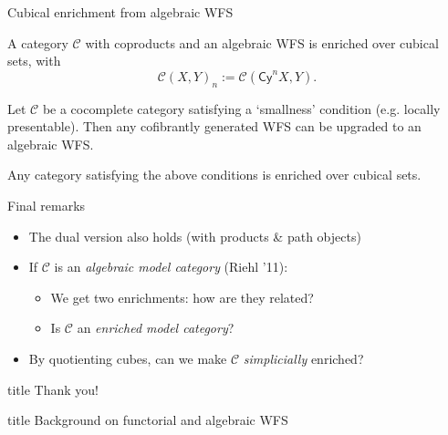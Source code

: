 \documentclass[compress]{beamer}
\newcommand{\varcat}[1]{\mathcal{#1}}
\newcommand{\C}{\varcat{C}}
\newcommand{\1}{\mathbf{1}}
\newcommand{\Cyl}{\mathsf{Cy}}
\begin{document}
\begin{frame}{Cubical enrichment from algebraic WFS}
	\begin{corollary}
		A category $\C$ with coproducts and an algebraic WFS is enriched over cubical sets, with
		\[
			\C(X,Y)_n := \C(\Cyl^n X, Y).	
		\]
	\end{corollary}
	\pause \vfill
	\begin{theorem}[Garner '09]
		Let $\C$ be a cocomplete category satisfying a `smallness' condition (e.g. locally presentable).
		Then any cofibrantly generated WFS can be upgraded to an algebraic WFS.
	\end{theorem}
	\pause \vfill
	\begin{corollary}
		Any category satisfying the above conditions is enriched over cubical sets.
	\end{corollary}
\end{frame}

\begin{frame}{Final remarks}
	\begin{itemize}[<+->]\setlength{\itemsep}{15pt}
		\item The dual version also holds (with products \& path objects)
		\item If $\C$ is an \emph{algebraic model category} (Riehl '11):
			\begin{itemize}[<+->]
		 		\item We get two enrichments: how are they related?
				\item Is $\C$ an \emph{enriched model category}?
			\end{itemize}
		\item By quotienting cubes, can we make $\C$ \emph{simplicially} enriched?
	\end{itemize}	
\end{frame}

\begin{frame}
  \vfill
  \centering
  \begin{beamercolorbox}[sep=8pt,center,shadow=true,rounded=true]{title}
    Thank you!\par%
  \end{beamercolorbox}
  \vfill
\end{frame}

\begin{frame}
  \vfill
  \centering
  \begin{beamercolorbox}[sep=8pt,center,shadow=true,rounded=true]{title}
    Background on functorial and algebraic WFS\par%
  \end{beamercolorbox}
  \vfill
\end{frame}
\end{document}
